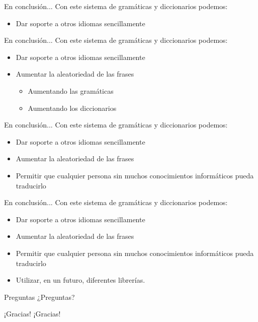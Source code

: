 
\begin{tframe}{En conclusión...}
	Con este sistema de gramáticas y diccionarios podemos:
	\begin{itemize}
		\item<+-| alert@+> Dar soporte a otros idiomas sencillamente
	\end{itemize}
\end{tframe}

\begin{tframe}{En conclusión...}
	Con este sistema de gramáticas y diccionarios podemos:
	\begin{itemize}
		\item Dar soporte a otros idiomas sencillamente
		\item<+-| alert@+> Aumentar la aleatoriedad de las frases
		\begin{itemize}
			\item Aumentando las gramáticas
			\item Aumentando los diccionarios
		\end{itemize}
	\end{itemize}
\end{tframe}

\begin{tframe}{En conclusión...}
	Con este sistema de gramáticas y diccionarios podemos:
	\begin{itemize}
		\item Dar soporte a otros idiomas sencillamente
		\item Aumentar la aleatoriedad de las frases
		\item<+-| alert@+> Permitir que cualquier persona sin muchos conocimientos informáticos pueda traducirlo
	\end{itemize}
\end{tframe}

\begin{tframe}{En conclusión...}
	Con este sistema de gramáticas y diccionarios podemos:
	\begin{itemize}
		\item Dar soporte a otros idiomas sencillamente
		\item Aumentar la aleatoriedad de las frases
		\item Permitir que cualquier persona sin muchos conocimientos informáticos pueda traducirlo
		\item<+-| alert@+> Utilizar, en un futuro, diferentes librerías.
	\end{itemize}
\end{tframe}


\begin{tframe}{Preguntas}
	\vspace*{\fill}
	\Large ¿Preguntas?
	\vspace*{\fill}
\end{tframe}

\begin{tframe}{¡Gracias!}
	\vspace*{\fill}
	\Large ¡Gracias!
	\vspace*{\fill}
\end{tframe}